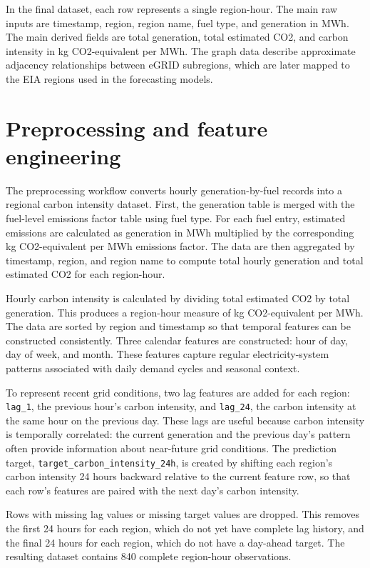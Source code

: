 \documentclass{article}
\begin{document}
In the final dataset, each row represents a single region-hour. The main raw inputs are timestamp, region, region name, fuel type, and generation in MWh. The main derived fields are total generation, total estimated CO2, and carbon intensity in kg CO2-equivalent per MWh. The graph data describe approximate adjacency relationships between eGRID subregions, which are later mapped to the EIA regions used in the forecasting models.

\section{Preprocessing and feature engineering}

The preprocessing workflow converts hourly generation-by-fuel records into a regional carbon intensity dataset. First, the generation table is merged with the fuel-level emissions factor table using fuel type. For each fuel entry, estimated emissions are calculated as generation in MWh multiplied by the corresponding kg CO2-equivalent per MWh emissions factor. The data are then aggregated by timestamp, region, and region name to compute total hourly generation and total estimated CO2 for each region-hour.

Hourly carbon intensity is calculated by dividing total estimated CO2 by total generation. This produces a region-hour measure of kg CO2-equivalent per MWh. The data are sorted by region and timestamp so that temporal features can be constructed consistently. Three calendar features are constructed: hour of day, day of week, and month. These features capture regular electricity-system patterns associated with daily demand cycles and seasonal context.

To represent recent grid conditions, two lag features are added for each region: \texttt{lag\_1}, the previous hour's carbon intensity, and \texttt{lag\_24}, the carbon intensity at the same hour on the previous day. These lags are useful because carbon intensity is temporally correlated: the current generation and the previous day's pattern often provide information about near-future grid conditions. The prediction target, \texttt{target\_carbon\_intensity\_24h}, is created by shifting each region's carbon intensity 24 hours backward relative to the current feature row, so that each row's features are paired with the next day's carbon intensity.

Rows with missing lag values or missing target values are dropped. This removes the first 24 hours for each region, which do not yet have complete lag history, and the final 24 hours for each region, which do not have a day-ahead target. The resulting dataset contains 840 complete region-hour observations. 
\end{document}
